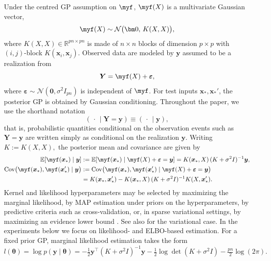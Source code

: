 \documentclass[11pt,a4paper]{article}
\newcommand{\by}{\boldsymbol{y}}
\newcommand{\btheta}{\boldsymbol{\theta}}
\begin{document}
\noindent
Under the centred GP assumption on $\myf$, $\myf(X)$ is a multivariate Gaussian vector,
\begin{displaymath}\myf(X) \sim \mathcal{N}\bigl(\bm 0,\, K(X,X)\bigr),\end{displaymath}
where $K(X,X)\in\mathbb{R}^{pn\times pn}$ is made of $n\times n$ blocks of dimension $p\times p$ with $(i,j)$-block $K(\boldsymbol{x}_i,\boldsymbol{x}_j)$. Observed data are modeled by $\by$ assumed to be a realization from
\begin{displaymath}\boldsymbol{Y}=\myf(X)+\boldsymbol{\varepsilon},\end{displaymath}
where $\boldsymbol{\varepsilon}\sim\mathcal{N}(\bm 0,\sigma^2 I_{pn})$ is independent of $\myf$. For test inputs $\boldsymbol{x}_\ast, \boldsymbol{x}_\ast'$, the posterior GP is obtained by Gaussian conditioning. Throughout the paper, we use the shorthand notation
\begin{equation*}
    (\,\cdot\,\mid \boldsymbol{Y}=\by)\equiv(\,\cdot\,\mid \by),
\end{equation*}
that is, probabilistic quantities conditional on the observation events such as $\boldsymbol{Y}=\by$ are written simply as conditional on the realization $\by$. Writing $K:=K(X,X),$ the posterior mean and covariance are given by
\begin{align*}
\mathbb{E}[\myf(\boldsymbol{x}_\ast)\mid \by]
&:=
\mathbb{E}[\myf(\boldsymbol{x}_\ast)\mid \myf(X)+\boldsymbol{\varepsilon}=\by]
=
K(\boldsymbol{x}_\ast,X)\,(K+\sigma^2 I)^{-1}\by,\\
\operatorname{Cov}\bigl(\myf(\boldsymbol{x}_\ast),\myf(\boldsymbol{x}_\ast')\mid \by\bigr)
&:=\operatorname{Cov}\bigl(
\myf(\boldsymbol{x}_\ast),\myf(\boldsymbol{x}_\ast')
\mid \myf(X)+\boldsymbol{\varepsilon}=\by
\bigr)\\
&=
K(\boldsymbol{x}_\ast,\boldsymbol{x}_\ast')
-
K(\boldsymbol{x}_\ast,X)\,(K+\sigma^2 I)^{-1}K(X,\boldsymbol{x}_\ast').
\end{align*}
Kernel and likelihood hyperparameters may be selected by maximizing the marginal likelihood, by MAP estimation under priors on the hyperparameters, by predictive criteria such as cross-validation, or, in sparse variational settings, by maximizing an evidence lower bound \citep[Chapter~5]{GPsforMLbook}. See also \citep{Titsias2009VariationalLO,Hensman2013GaussianPF} for the variational case.
In the experiments below we focus on likelihood- and ELBO-based estimation.
For a fixed prior GP, marginal likelihood estimation takes the form
\begin{equation}\label{eq:likelihood} l(\btheta)=\log p(\by\mid \btheta) = -\tfrac12 \by^\top (K+\sigma^2 I)^{-1}\by -\tfrac12 \log\det(K+\sigma^2 I) -\tfrac{pn}{2}\log(2\pi).\end{equation}
\end{document}
